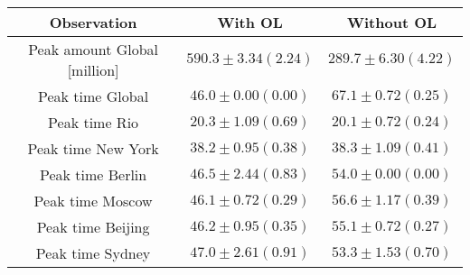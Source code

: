 \begin{tabular}[H]{c | c | c |}
Observation & With OL & Without OL \\ \hline 
 Peak amount Global [million]& $590.3\pm 3.34 (2.24)$ & $289.7 \pm 6.30 (4.22)$\\ 
 Peak time Global & $46.0\pm 0.00( 0.00)$ & $67.1 \pm 0.72 (0.25)$\\ 
 Peak time Rio & $20.3\pm 1.09( 0.69)$ & $20.1 \pm 0.72 (0.24)$\\ 
 Peak time New York & $38.2\pm 0.95( 0.38)$ & $38.3 \pm 1.09 (0.41)$\\ 
 Peak time Berlin & $46.5\pm 2.44( 0.83)$ & $54.0 \pm 0.00 (0.00)$\\ 
 Peak time Moscow & $46.1\pm 0.72( 0.29)$ & $56.6 \pm 1.17 (0.39)$\\ 
 Peak time Beijing & $46.2\pm 0.95( 0.35)$ & $55.1 \pm 0.72 (0.27)$\\ 
 Peak time Sydney & $47.0\pm 2.61( 0.91)$ & $53.3 \pm 1.53 (0.70)$
\end{tabular}